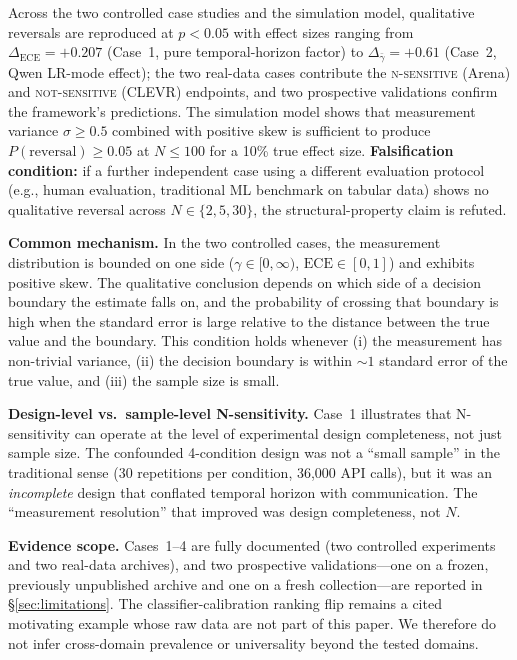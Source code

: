 \documentclass[11pt]{article}
\begin{document}
Across the two controlled case studies and the simulation model, qualitative reversals are reproduced at $p<0.05$ with effect sizes ranging from $\Delta_{\text{ECE}}=+0.207$ (Case~1, pure temporal-horizon factor) to $\Delta_{\bar{\gamma}}=+0.61$ (Case~2, Qwen LR-mode effect); the two real-data cases contribute the \textsc{n-sensitive} (Arena) and \textsc{not-sensitive} (CLEVR) endpoints, and two prospective validations confirm the framework's predictions. The simulation model shows that measurement variance $\sigma \geq 0.5$ combined with positive skew is sufficient to produce $P(\text{reversal}) \geq 0.05$ at $N \leq 100$ for a 10\% true effect size. \textbf{Falsification condition:} if a further independent case using a different evaluation protocol (e.g., human evaluation, traditional ML benchmark on tabular data) shows no qualitative reversal across $N \in \{2, 5, 30\}$, the structural-property claim is refuted.

\textbf{Common mechanism.} In the two controlled cases, the measurement distribution is bounded on one side ($\gamma \in [0, \infty)$, $\text{ECE} \in [0, 1]$) and exhibits positive skew. The qualitative conclusion depends on which side of a decision boundary the estimate falls on, and the probability of crossing that boundary is high when the standard error is large relative to the distance between the true value and the boundary. This condition holds whenever (i) the measurement has non-trivial variance, (ii) the decision boundary is within $\sim 1$ standard error of the true value, and (iii) the sample size is small.

\textbf{Design-level vs.\ sample-level N-sensitivity.} Case~1 illustrates that N-sensitivity can operate at the level of experimental design completeness, not just sample size. The confounded 4-condition design was not a ``small sample'' in the traditional sense (30 repetitions per condition, 36,000 API calls), but it was an \emph{incomplete} design that conflated temporal horizon with communication. The ``measurement resolution'' that improved was design completeness, not $N$.

\textbf{Evidence scope.} Cases~1--4 are fully documented (two controlled experiments and two real-data archives), and two prospective validations---one on a frozen, previously unpublished archive and one on a fresh collection---are reported in \S\ref{sec:limitations}. The classifier-calibration ranking flip remains a cited motivating example whose raw data are not part of this paper. We therefore do not infer cross-domain prevalence or universality beyond the tested domains.
\end{document}
